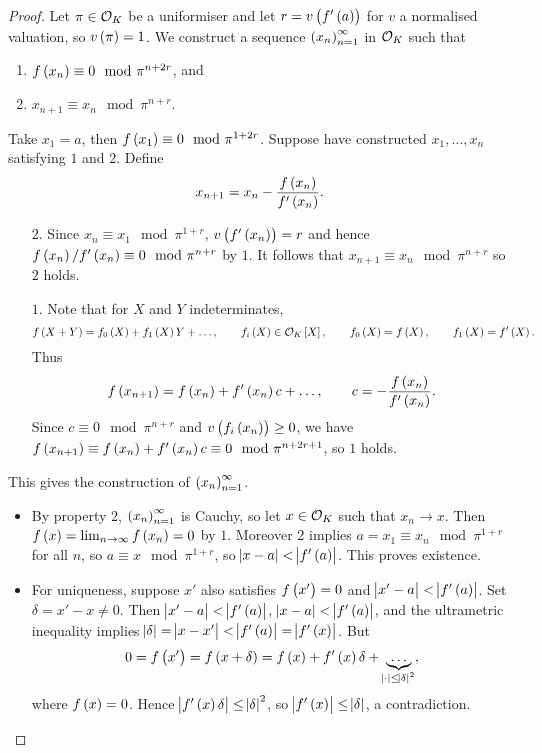 \begin{proof}
Let $ \pi \in \mathcal{O}_K $ be a uniformiser and let $ r = v\br{f'\br{a}} $ for $ v $ a normalised valuation, so $ v\br{\pi} = 1 $. We construct a sequence $ \br{x_n}_{n = 1}^\infty $ in $ \mathcal{O}_K $ such that
\begin{enumerate}
\item $ f\br{x_n} \equiv 0 \mod \pi^{n + 2r} $, and
\item $ x_{n + 1} \equiv x_n \mod \pi^{n + r} $.
\end{enumerate}
Take $ x_1 = a $, then $ f\br{x_1} \equiv 0 \mod \pi^{1 + 2r} $. Suppose have constructed $ x_1, \dots, x_n $ satisfying $ 1 $ and $ 2 $. Define
$$ x_{n + 1} = x_n - \dfrac{f\br{x_n}}{f'\br{x_n}}. $$
\begin{itemize}
\item[$ 2 $.] Since $ x_n \equiv x_1 \mod \pi^{1 + r} $, $ v\br{f'\br{x_n}} = r $ and hence $ f\br{x_n} / f'\br{x_n} \equiv 0 \mod \pi^{n + r} $ by $ 1 $. It follows that $ x_{n + 1} \equiv x_n \mod \pi^{n + r} $ so $ 2 $ holds.
\item[$ 1 $.] Note that for $ X $ and $ Y $ indeterminates,
$$ f\br{X + Y} = f_0\br{X} + f_1\br{X}Y + \dots, \qquad f_i\br{X} \in \OOO_K\sbr{X}, \qquad f_0\br{X} = f\br{X}, \qquad f_1\br{X} = f'\br{X}. $$
Thus
$$ f\br{x_{n + 1}} = f\br{x_n} + f'\br{x_n}c + \dots, \qquad c = -\dfrac{f\br{x_n}}{f'\br{x_n}}. $$
Since $ c \equiv 0 \mod \pi^{n + r} $ and $ v\br{f_i\br{x_n}} \ge 0 $, we have $ f\br{x_{n + 1}} \equiv f\br{x_n} + f'\br{x_n}c \equiv 0 \mod \pi^{n + 2r + 1} $, so $ 1 $ holds.
\end{itemize}
This gives the construction of $ \br{x_n}_{n = 1}^\infty $.
\begin{itemize}
\item By property $ 2 $, $ \br{x_n}_{n = 1}^\infty $ is Cauchy, so let $ x \in \mathcal{O}_K $ such that $ x_n \to x $. Then $ f\br{x} = \lim_{n \to \infty} f\br{x_n} = 0 $ by $ 1 $. Moreover $ 2 $ implies $ a = x_1 \equiv x_n \mod \pi^{1 + r} $ for all $ n $, so $ a \equiv x \mod \pi^{1 + r} $, so $ \abs{x - a} < \abs{f'\br{a}} $. This proves existence.
\item For uniqueness, suppose $ x' $ also satisfies $ f\br{x'} = 0 $ and $ \abs{x' - a} < \abs{f'\br{a}} $. Set $ \delta = x' - x \ne 0 $. Then $ \abs{x' - a} < \abs{f'\br{a}} $, $ \abs{x - a} < \abs{f'\br{a}} $, and the ultrametric inequality implies $ \abs{\delta} = \abs{x - x'} < \abs{f'\br{a}} = \abs{f'\br{x}} $. But
$$ 0 = f\br{x'} = f\br{x + \delta} = f\br{x} + f'\br{x}\delta + \underbrace{\dots}_{\abs{\cdot} \le \abs{\delta}^2}, $$
where $ f\br{x} = 0 $. Hence $ \abs{f'\br{x}\delta} \le \abs{\delta}^2 $, so $ \abs{f'\br{x}} \le \abs{\delta} $, a contradiction.
\end{itemize}
\end{proof}

